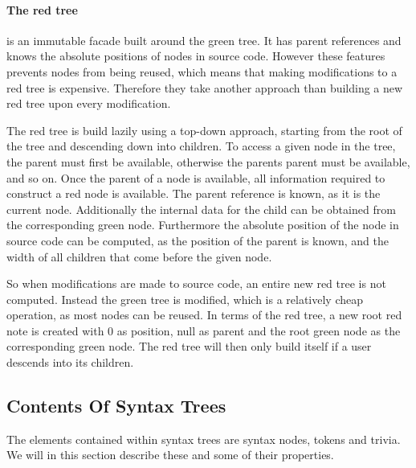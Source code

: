 

\paragraph{The red tree} is an immutable facade built around the green tree. It has parent references and knows the absolute positions of nodes in source code. However these features prevents nodes from being reused, which means that making modifications to a red tree is expensive. Therefore they take another approach than building a new red tree upon every modification\cite{lippert2012redgreen}. 

The red tree is build lazily using a top-down approach, starting from the root of the tree and descending down into children. To access a given node in the tree, the parent must first be available, otherwise the parents parent must be available, and so on. Once the parent of a node is available, all information required to construct a red node is available. The parent reference is known, as it is the current node. Additionally the internal data for the child can be obtained from the corresponding green node. Furthermore the absolute position of the node in source code can be computed, as the position of the parent is known, and the width of all children that come before the given node\cite{sadovRoslynPerf}.

So when modifications are made to source code, an entire new red tree is not computed. Instead the green tree is modified, which is a relatively cheap operation, as most nodes can be reused. In terms of the red tree, a new root red note is created with 0 as position, null as parent and the root green node as the corresponding green node. The red tree will then only build itself if a user descends into its children\cite{sadovRoslynPerf}. %


\subsection{Contents Of Syntax Trees}
The elements contained within syntax trees are syntax nodes, tokens and trivia. We will in this section describe these and some of their properties.


